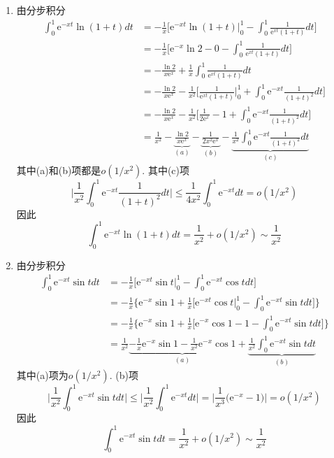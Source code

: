 \begin{solution}
\begin{enumerate}
\item 由分步积分
\begin{align*}
\int_{0}^{1}\mathrm{e}^{-xt}\ln(1+t)dt & =-\frac{1}{x}\bigg[\mathrm{e}^{-xt}\ln(1+t)\Big|_{0}^{1}-\int_{0}^{1}\frac{1}{\mathrm{e}^{xt}(1+t)}dt\bigg]\\
 & =-\frac{1}{x}\bigg[\mathrm{e}^{-x}\ln2-0-\int_{0}^{1}\frac{1}{\mathrm{e}^{xt}(1+t)}dt\bigg]\\
 & =-\frac{\ln2}{x\mathrm{e}^{x}}+\frac{1}{x}\int_{0}^{1}\frac{1}{\mathrm{e}^{xt}(1+t)}dt\\
 & =-\frac{\ln2}{x\mathrm{e}^{x}}-\frac{1}{x^{2}}\bigg[\frac{1}{\mathrm{e}^{xt}(1+t)}\bigg|_{0}^{1}+\int_{0}^{1}\mathrm{e}^{-xt}\frac{1}{(1+t)^{2}}dt\bigg]\\
 & =-\frac{\ln2}{x\mathrm{e}^{x}}-\frac{1}{x^{2}}\bigg[\frac{1}{2\mathrm{e}^{x}}-1+\int_{0}^{1}\mathrm{e}^{-xt}\frac{1}{(1+t)^{2}}dt\bigg]\\
 & =\frac{1}{x^{2}}-\underbrace{\frac{\ln2}{x\mathrm{e}^{x}}}_{(a)}-\underbrace{\frac{1}{2x^{2}\mathrm{e}^{x}}}_{(b)}-\underbrace{\frac{1}{x^{2}}\int_{0}^{1}\mathrm{e}^{-xt}\frac{1}{(1+t)^{2}}dt}_{(c)}
\end{align*}
其中(a)和(b)项都是$o(1/x^{2})$. 其中(c)项
\[
\Bigg|\frac{1}{x^{2}}\int_{0}^{1}\mathrm{e}^{-xt}\frac{1}{(1+t)^{2}}dt\Bigg|\leq\frac{1}{4x^{2}}\int_{0}^{1}\mathrm{e}^{-xt}dt=o(1/x^{2})
\]
因此
\[
\int_{0}^{1}\mathrm{e}^{-xt}\ln(1+t)dt=\frac{1}{x^{2}}+o(1/x^{2})\sim\frac{1}{x^{2}}
\]

\item 由分步积分
\begin{align*}
\int_{0}^{1}\mathrm{e}^{-xt}\sin tdt & =-\frac{1}{x}\bigg[\mathrm{e}^{-xt}\sin t\big|_{0}^{1}-\int_{0}^{1}\mathrm{e}^{-xt}\cos tdt\bigg]\\
 & =-\frac{1}{x}\bigg\{\mathrm{e}^{-x}\sin1+\frac{1}{x}\Big[\mathrm{e}^{-xt}\cos t\Big|_{0}^{1}-\int_{0}^{1}\mathrm{e}^{-xt}\sin tdt\Big]\bigg\}\\
 & =-\frac{1}{x}\bigg\{\mathrm{e}^{-x}\sin1+\frac{1}{x}\Big[\mathrm{e}^{-x}\cos1-1-\int_{0}^{1}\mathrm{e}^{-xt}\sin tdt\Big]\bigg\}\\
 & =\frac{1}{x^{2}}\underbrace{-\frac{1}{x}\mathrm{e}^{-x}\sin1-\frac{1}{x^{2}}\mathrm{e}^{-x}\cos1}_{(a)}+\underbrace{\frac{1}{x^{2}}\int_{0}^{1}\mathrm{e}^{-xt}\sin tdt}_{(b)}
\end{align*}
其中(a)项为$o(1/x^{2})$. (b)项
\[
\bigg|\frac{1}{x^{2}}\int_{0}^{1}\mathrm{e}^{-xt}\sin tdt\bigg|\leq\bigg|\frac{1}{x^{2}}\int_{0}^{1}\mathrm{e}^{-xt}dt\bigg|=\bigg|\frac{1}{x^{3}}\Big(\mathrm{e}^{-x}-1\Big)\bigg|=o(1/x^{2})
\]
因此
\[
\int_{0}^{1}\mathrm{e}^{-xt}\sin tdt=\frac{1}{x^{2}}+o(1/x^{2})\sim\frac{1}{x^{2}}
\]
\end{enumerate}

\end{solution}
